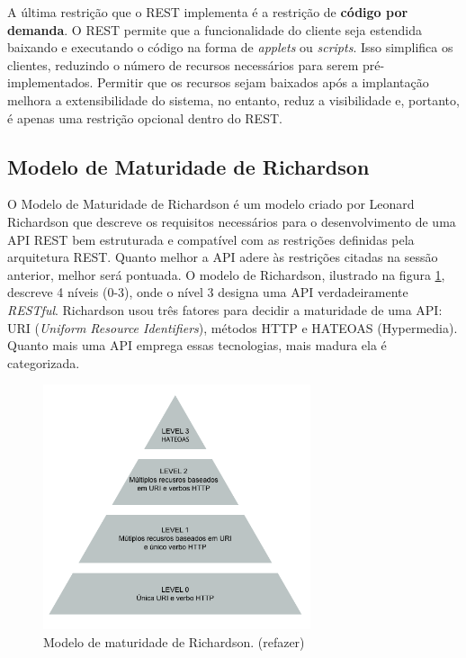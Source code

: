 A última restrição que o REST implementa é a restrição de \textbf{código por demanda}. O REST permite que a funcionalidade do cliente seja estendida baixando e executando o código na forma de \textit{applets} ou \textit{scripts}. Isso simplifica os clientes, reduzindo o número de recursos necessários para serem pré-implementados. Permitir que os recursos sejam baixados após a implantação melhora a extensibilidade do sistema, no entanto, reduz a visibilidade e, portanto, é apenas uma restrição opcional dentro do REST.

\subsection{Modelo de Maturidade de Richardson}

O Modelo de Maturidade de Richardson é um modelo criado por Leonard Richardson que descreve os requisitos necessários para o desenvolvimento de uma API REST bem estruturada e compatível com as restrições definidas pela arquitetura REST. Quanto melhor a API adere às restrições citadas na sessão anterior, melhor será pontuada. O modelo de Richardson, ilustrado na figura \ref{fig:rest-maturity-model}, descreve 4 níveis (0-3), onde o nível 3 designa uma API verdadeiramente \textit{RESTful}. Richardson usou três fatores para decidir a maturidade de uma API: URI (\textit{Uniform Resource Identifiers}), métodos HTTP e HATEOAS (Hypermedia). Quanto mais uma API emprega essas tecnologias, mais madura ela é categorizada.

\begin{figure}[htbp]
\centering
\includegraphics[width=0.7\textwidth]{figuras/modelo-maturidade.png}
\caption{Modelo de maturidade de Richardson. (refazer)}
\label{fig:rest-maturity-model}
\end{figure}

